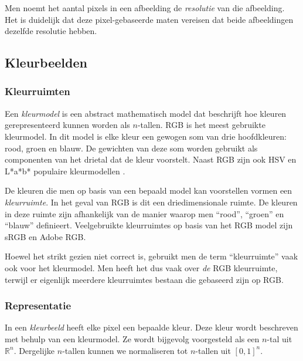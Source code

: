Men noemt het aantal pixels in een afbeelding de \emph{resolutie} van die afbeelding. Het is
duidelijk dat deze pixel-gebaseerde maten vereisen dat beide afbeeldingen dezelfde resolutie 
hebben.


\subsection{Kleurbeelden}
\label{sectie:pixelgeb_kleurbeelden}

\subsubsection{Kleurruimten}

Een \emph{kleurmodel} is een abstract mathematisch model dat beschrijft hoe kleuren gerepresenteerd 
kunnen worden als $n$-tallen. RGB is het meest gebruikte kleurmodel. In dit model is elke kleur
een gewogen som van drie hoofdkleuren: rood, groen en blauw. De gewichten van deze som
worden gebruikt als componenten van het drietal dat de kleur voorstelt. Naast RGB zijn ook
HSV en L*a*b* populaire kleurmodellen \cite{phillips:beeldverwerking}.

De kleuren die men op basis van een bepaald model kan voorstellen vormen een \emph{kleurruimte}. 
In het geval van RGB is dit een driedimensionale ruimte. De kleuren in deze ruimte zijn afhankelijk
van de manier waarop men ``rood'', ``groen'' en ``blauw'' definieert. Veelgebruikte kleurruimtes 
op basis van het RGB model zijn sRGB en Adobe RGB.

Hoewel het strikt gezien niet correct is, gebruikt men de term ``kleurruimte'' vaak ook voor het
kleurmodel. Men heeft het dus vaak over \emph{de} RGB kleurruimte, terwijl er eigenlijk meerdere
kleurruimtes bestaan die gebaseerd zijn op RGB. 

\subsubsection{Representatie}

In een \emph{kleurbeeld} heeft elke pixel een bepaalde kleur. Deze kleur wordt beschreven met
behulp van een kleurmodel. Ze wordt bijgevolg voorgesteld als een $n$-tal uit
$\mathbb{R}^n$. Dergelijke $n$-tallen kunnen we normaliseren tot $n$-tallen uit $[0,1]^n$. 

